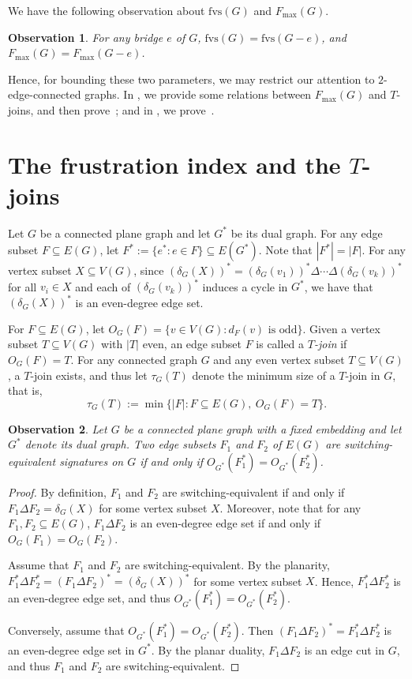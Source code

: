 \documentclass[a4paper,12pt]{article}
\theoremstyle{plain}
\newtheorem{observation}[observation]{Observation}
\theoremstyle{definition}
\theoremstyle{remark}
\numberwithin{equation}{section}
\newcommand{\abs}[1]{\lvert#1\rvert}
\begin{document}
We have the following observation about $\mathrm{fvs}(G)$ and $F_{\max}(G)$.
\begin{observation}\label{obs:bridge}
For any bridge $e$ of $G$, $\mathrm{fvs}(G)=\mathrm{fvs}(G-e)$, and $F_{\max}(G)=F_{\max}(G-e)$.
\end{observation}

Hence, for bounding these two parameters, we may restrict our attention to $2$-edge-connected graphs. In , we provide some relations between $F_{\max}(G)$ and $T$-joins, and then prove~; and in , we prove~.



\section[Tjoins]{The frustration index and the $T$-joins}\label{sec:eq-fvs}

Let $G$ be a connected plane graph and let $G^*$ be its dual graph. For any edge subset $F\subseteq E(G)$, let $F^*:=\{e^*: e\in F\}\subseteq E(G^*)$. Note that $|F^*|=|F|$. For any vertex subset $X\subseteq V(G)$, since $(\delta_G(X))^*=(\delta_G(v_1))^*\Delta\cdots\Delta (\delta_G(v_k))^*$ for all $v_i\in X$ and each of $(\delta_G(v_k))^*$ induces a cycle in $G^*$, we have that $(\delta_G(X))^*$ is an even-degree edge set. 

For $F\subseteq E(G)$, let $O_{G}(F)=\{v\in V(G): d_F(v)\text{ is odd}\}$. Given a vertex subset $T\subseteq V(G)$ with $|T|$ even, an edge subset $F$ is called a \emph{$T$-join} if $O_{G}(F)=T$. For any connected graph $G$ and any even vertex subset $T\subseteq V(G)$, a $T$-join exists, and thus let $\tau_G(T)$ denote the minimum size of a $T$-join in $G$, that is, $$\tau_G(T):=\min\{\abs{F}: F\subseteq E(G),\ O_{G}(F)=T\}.$$

\begin{observation}\label{obs:dual-signatures}
Let $G$ be a connected plane graph with a fixed embedding and let $G^*$ denote its dual graph. Two edge subsets $F_1$ and $F_2$ of $E(G)$ are switching-equivalent signatures on $G$ if and only if $O_{G^*}(F_1^*)=O_{G^*}(F_2^*)$.
\end{observation}
\begin{proof}
By definition, $F_1$ and $F_2$ are switching-equivalent if and only if $F_1\Delta F_2=\delta_G(X)$ for some vertex subset $X$. Moreover, note that for any $F_1,F_2\subseteq E(G)$, $F_1\Delta F_2$ is an even-degree edge set if and only if $O_{G}(F_1)=O_{G}(F_2)$.

Assume that $F_1$ and $F_2$ are switching-equivalent. By the planarity, $F_1^*\Delta F_2^*=(F_1\Delta F_2)^*=(\delta_G(X))^*$ for some vertex subset $X$. Hence, $F_1^*\Delta F_2^*$ is an even-degree edge set, and thus $O_{G^*}(F_1^*)=O_{G^*}(F_2^*)$. 

Conversely, assume that $O_{G^*}(F_1^*)=O_{G^*}(F_2^*)$. Then $(F_1\Delta F_2)^*=F_1^*\Delta F_2^*$ is an even-degree edge set in $G^*$. By the planar duality, $F_1\Delta F_2$ is an edge cut in $G$, and thus $F_1$ and $F_2$ are switching-equivalent.
\end{proof}
\end{document}
